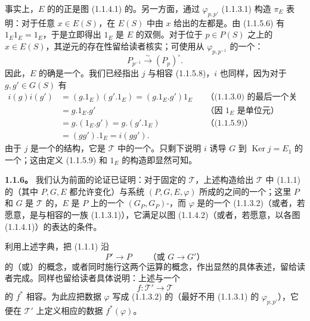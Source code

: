事实上，$E$ 的的正是图 (1.1.4.1) 的。另一方面，通过 $\varphi_{p,p'}$ (1.1.3.1) 构造 $\pi_E$ 表明：对于任意 $x\in E(S)$，在 $E(S)$ 中由 $x$ 给出的左都是。由 (1.1.5.6) 有 $1_E1_E=1_E$，于是立即得出 $1_E$ 是 $E$ 的双侧。对于位于 $p\in P(S)$ 之上的 $x\in E(S)$，其逆元的存在性留给读者核实；可使用从 $\varphi_{p,p^{-1}}$ 的一个：
\[
P_{p^{-1}}\xrightarrow{\sim}(P_p)^\circ.
\tag{1.1.5.10}
\]
因此，$E$ 的确是一个。我们已经指出 $j$ 与相容 (1.1.5.8)，$i$ 也同样，因为对于 $g,g'\in G(S)$ 有
\[
\begin{aligned}
i(g)i(g')&=(g.1_E)(g'.1_E)=(g.1_E.g')1_E
&&\text{（(1.1.3.0) 的最后一个关系）}\\
&=g.1_E.g'&&\text{（因 $1_E$ 是单位元）}\\
&=g.(1_E.g')=g.(g'.1_E)&&\text{（(1.1.5.9)）}\\
&=(gg').1_E=i(gg').
\end{aligned}
\]
由于 $j$ 是一个的结构，它是 $\mathcal T$ 中的一个。只剩下说明 $i$ 诱导 $G$ 到 $\operatorname{Ker}j=E_1$ 的一个；这由定义 (1.1.5.9) 和 $1_E$ 的构造即显然可知。

\textbf{1.1.6。} 我们认为前面的论证已证明：对于固定的 $\mathcal T$，上述构造给出 $\mathcal T$ 中 (1.1.1) 的（其中 $P,G,E$ 都允许变化）与系统 $(P,G,E,\varphi)$ 所成的之间的一个；这里 $P$ 和 $G$ 是 $\mathcal T$ 的，$E$ 是 $P$ 上的一个 $(G_P,G_P)$-，而 $\varphi$ 是的一个 (1.1.3.2)（或者，若愿意，是与相容的一族 (1.1.3.1)），它满足以图 (1.1.4.2)（或者，若愿意，以各图 (1.1.4.1)）的表达的条件。

利用上述字典，把 (1.1.1) 沿
\[
P'\longrightarrow P\qquad\text{（或 }G\longrightarrow G'\text{）}
\]
的（或）的概念，或者同时施行这两个运算的概念，作出显然的具体表述，留给读者完成。同样也留给读者具体说明：上述与一个
\[
f:\mathcal T'\longrightarrow\mathcal T
\]
的 $f^*$ 相容。为此应把数据 $\varphi$ 写成 (1.1.3.2) 的（最好不用 (1.1.3.1) 的 $\varphi_{p,p'}$），它便在 $\mathcal T'$ 上定义相应的数据 $f^*(\varphi)$。

